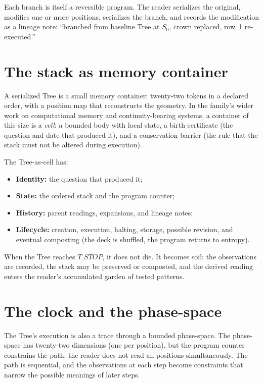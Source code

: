 Each branch is itself a reversible program. The reader serializes the original,
modifies one or more positions, serializes the branch, and records the
modification as a lineage note: ``branched from baseline Tree at $S_0$, crown
replaced, row~1 re-executed.''

\section{The stack as memory container}

A serialized Tree is a small memory container: twenty-two tokens in a declared
order, with a position map that reconstructs the geometry. In the family's
wider work on computational memory and continuity-bearing systems, a container
of this size is a \emph{cell}: a bounded body with local state, a birth
certificate (the question and date that produced it), and a conservation barrier
(the rule that the stack must not be altered during execution).

The Tree-as-cell has:

\begin{itemize}
\item \textbf{Identity:} the question that produced it;
\item \textbf{State:} the ordered stack and the program counter;
\item \textbf{History:} parent readings, expansions, and lineage notes;
\item \textbf{Lifecycle:} creation, execution, halting, storage, possible
      revision, and eventual composting (the deck is shuffled, the program
      returns to entropy).
\end{itemize}

When the Tree reaches $T\_STOP$, it does not die. It becomes soil: the
observations are recorded, the stack may be preserved or composted, and the
derived reading enters the reader's accumulated garden of tested patterns.

\section{The clock and the phase-space}

The Tree's execution is also a trace through a bounded phase-space. The
phase-space has twenty-two dimensions (one per position), but the program
counter constrains the path: the reader does not read all positions
simultaneously. The path is sequential, and the observations at each step
become constraints that narrow the possible meanings of later steps.

